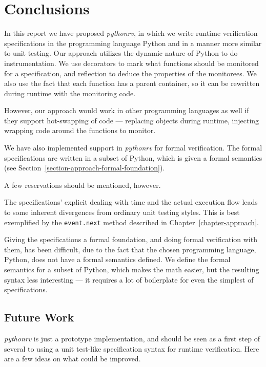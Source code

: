 
\pagestyle{newchap}
\chapter{Conclusions} \label{chapter-conclusions}

In this report we have proposed \textit{pythonrv}, in which we write runtime
verification specifications in the programming language Python and in a manner
more similar to unit testing. Our approach utilizes the dynamic nature of
Python to do instrumentation. We use decorators to mark what functions should
be monitored for a specification, and reflection to deduce the properties of
the monitorees. We also use the fact that each function has a parent container,
so it can be rewritten during runtime with the monitoring code.

However, our approach would work in other programming languages as well if they
support hot-swapping of code --- replacing objects during runtime, injecting
wrapping code around the functions to monitor.

We have also implemented support in \textit{pythonrv} for formal verification.
The formal specifications are written in a subset of Python, which is given a
formal semantics (see Section~\ref{section-approach-formal-foundation}).

A few reservations should be mentioned, however.

The specifications' explicit dealing with time and the actual execution flow
leads to some inherent divergences from ordinary unit testing styles. This is
best exemplified by the \texttt{event.next} method described in
Chapter~\ref{chapter-approach}.

Giving the specifications a formal foundation, and doing formal verification
with them, has been difficult, due to the fact that the chosen programming
language, Python, does not have a formal semantics defined. We define the
formal semantics for a subset of Python, which makes the math easier, but the
resulting syntax less interesting --- it requires a lot of boilerplate for even
the simplest of specifications.


\section{Future Work}

\textit{pythonrv} is just a prototype implementation, and should be seen as a
first step of several to using a unit test-like specification syntax for
runtime verification. Here are a few ideas on what could be improved.


